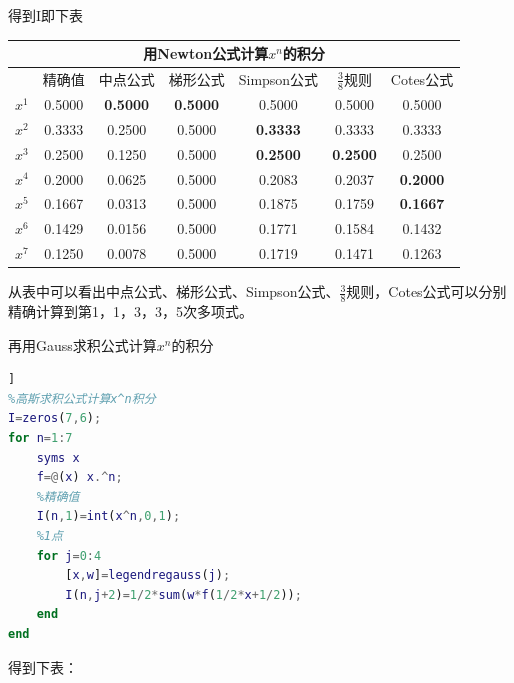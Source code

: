\documentclass{ctexart}
\begin{document}
\begin{enumerate}
得到I即下表

\begin{tabular}{|c|c|c|c|c|c|c|}
\hline
\multicolumn{7}{|c|}{用Newton公式计算\(x^n\)的积分}\\ 
\hline
&精确值 &中点公式 &梯形公式 &Simpson公式 &\(\frac{3}{8}\)规则 &Cotes公式 \\
\hline
\(x^1\) &0.5000 &\bf 0.5000 &\bf 0.5000 &0.5000 &0.5000 &0.5000 \\
\hline
\(x^2\) &0.3333 &0.2500 &0.5000 & \bf 0.3333 &0.3333 &0.3333 \\
\hline
\(x^3\) &0.2500 &0.1250 &0.5000 & \bf 0.2500 &\bf 0.2500 &0.2500 \\
\hline
\(x^4\) &0.2000 &0.0625 &0.5000 &0.2083 &0.2037 &\bf 0.2000 \\
\hline
\(x^5\) &0.1667 &0.0313 &0.5000 &0.1875 &0.1759 &\bf 0.1667 \\
\hline
\(x^6\) &0.1429 &0.0156 &0.5000 &0.1771 &0.1584 &0.1432 \\
\hline
\(x^7\) &0.1250 &0.0078 &0.5000 &0.1719 &0.1471 &0.1263 \\
\hline
\end{tabular}


从表中可以看出中点公式、梯形公式、Simpson公式、\(\frac{3}{8}\)规则，Cotes公式可以分别精确计算到第1，1，3，3，5次多项式。

再用Gauss求积公式计算\(x^n\)的积分

\begin{lstlisting}[language=Matlab,keywordstyle=\color{blue!70},commentstyle=\color{red!50!green!50!blue!50},frame=shadowbox, rulesepcolor=\color{red!20!green!20!blue!20}] ]
%高斯求积公式计算x^n积分
I=zeros(7,6);
for n=1:7
    syms x
    f=@(x) x.^n;
    %精确值
    I(n,1)=int(x^n,0,1);
    %1点
    for j=0:4
        [x,w]=legendregauss(j);
        I(n,j+2)=1/2*sum(w*f(1/2*x+1/2));
    end
end
\end{lstlisting}

得到下表：


\end{enumerate}
\end{document}
